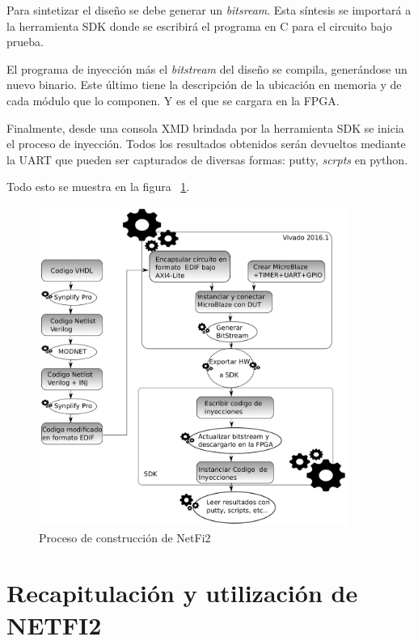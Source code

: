 \documentclass[a4paper,openright,12pt]{report}
\begin{document}
Para sintetizar el diseño se debe  generar un \textit{bitsream}. Esta síntesis se importará a la herramienta SDK donde se escribirá el programa en C  para el circuito bajo prueba. 

El programa de inyección  más el \textit{bitstream} del diseño se compila, generándose un  nuevo binario. Este último tiene la descripción de la ubicación en  memoria y de cada módulo que lo componen. Y es el que se cargara en la FPGA.

Finalmente, desde una consola XMD brindada por la herramienta SDK se inicia el proceso de inyección. Todos los resultados obtenidos serán devueltos mediante la UART que pueden ser capturados de diversas formas: putty, \textit{scrpts} en python.

Todo esto se muestra en la figura ~\ref{proceso}.
\begin{figure}[H]
	\centering
	\includegraphics[width=0.9\textwidth]{img/Proceso.pdf}
	\caption{Proceso de construcción de NetFi2 }
	\label{proceso}
    \end{figure}
    
    
    
    

    

\chapter{Recapitulación y utilización de NETFI2}
\end{document}
